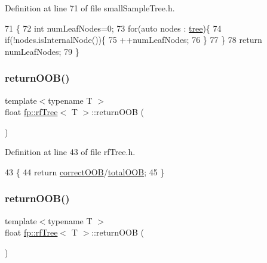 Definition at line 71 of file small\+Sample\+Tree.\+h.


\begin{DoxyCode}
71                                                \{
72                     \textcolor{keywordtype}{int} numLeafNodes=0;
73                     \textcolor{keywordflow}{for}(\textcolor{keyword}{auto} nodes : \hyperlink{classtree}{tree})\{
74                         \textcolor{keywordflow}{if}(!nodes.isInternalNode())\{
75                             ++numLeafNodes;
76                         \}
77                     \}
78                     \textcolor{keywordflow}{return} numLeafNodes;
79                 \}
\end{DoxyCode}
\mbox{\label{classfp_1_1rfTree_aee6bf6e8e695392880f1cc9ac0102ba6}} 
\subsubsection{\texorpdfstring{return\+O\+O\+B()}{returnOOB()}\hspace{0.1cm}{\footnotesize\ttfamily [1/2]}}
{\footnotesize\ttfamily template$<$typename T $>$ \\
float \hyperlink{classfp_1_1rfTree}{fp\+::rf\+Tree}$<$ T $>$\+::return\+O\+OB (\begin{DoxyParamCaption}{ }\end{DoxyParamCaption})\hspace{0.3cm}{\ttfamily [inline]}}



Definition at line 43 of file rf\+Tree.\+h.


\begin{DoxyCode}
43                                         \{
44                     \textcolor{keywordflow}{return} \hyperlink{classfp_1_1rfTree_a83832650bcea8d63cdcd480d9ddc6e6e}{correctOOB}/\hyperlink{classfp_1_1rfTree_aa200dc228adc20c12e514364d2b674df}{totalOOB};
45                 \}
\end{DoxyCode}
\mbox{\label{classfp_1_1rfTree_aee6bf6e8e695392880f1cc9ac0102ba6}} 
\subsubsection{\texorpdfstring{return\+O\+O\+B()}{returnOOB()}\hspace{0.1cm}{\footnotesize\ttfamily [2/2]}}
{\footnotesize\ttfamily template$<$typename T $>$ \\
float \hyperlink{classfp_1_1rfTree}{fp\+::rf\+Tree}$<$ T $>$\+::return\+O\+OB (\begin{DoxyParamCaption}{ }\end{DoxyParamCaption})\hspace{0.3cm}{\ttfamily [inline]}}



